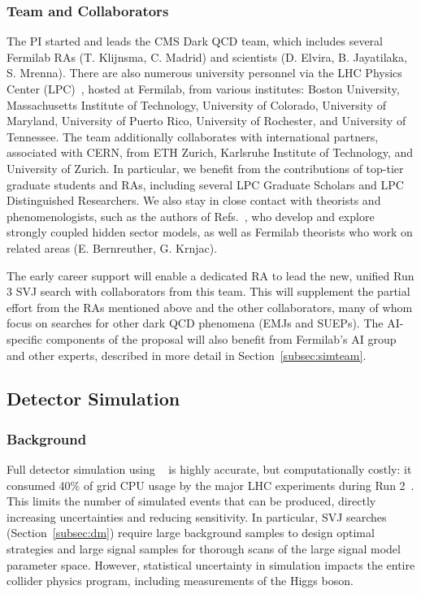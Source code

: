 \subsubsection{Team and Collaborators}\label{subsec:dmteam}

The PI started and leads the CMS Dark QCD team, which includes several Fermilab RAs (T. Klijnsma, C. Madrid) and scientists (D. Elvira, B. Jayatilaka, S. Mrenna).
There are also numerous university personnel via the LHC Physics Center (LPC)~\cite{LPC}, hosted at Fermilab, from various institutes:
Boston University, Massachusetts Institute of Technology, University of Colorado, University of Maryland, University of Puerto Rico, University of Rochester, and University of Tennessee.
The team additionally collaborates with international partners, associated with CERN, from ETH Zurich, Karlsruhe Institute of Technology, and University of Zurich.
In particular, we benefit from the contributions of top-tier graduate students and RAs, including several LPC Graduate Scholars and LPC Distinguished Researchers.
We also stay in close contact with theorists and phenomenologists,
such as the authors of Refs.~\cite{Strassler:2006im,Cohen:2015toa,Schwaller:2015gea,Knapen:2016hky,Albouy:2022cin}, who develop and explore strongly coupled hidden sector models,
as well as Fermilab theorists who work on related areas (E. Bernreuther, G. Krnjac).

The early career support will enable a dedicated RA to lead the new, unified Run 3 SVJ search with collaborators from this team.
This will supplement the partial effort from the RAs mentioned above and the other collaborators, many of whom focus on searches for other dark QCD phenomena (EMJs and SUEPs).
The AI-specific components of the proposal will also benefit from Fermilab's AI group and other experts, described in more detail in Section~\ref{subsec:simteam}.

\subsection{Detector Simulation}\label{subsec:sim}

\subsubsection{Background}\label{subsec:simbkg}

Full detector simulation using \GEANTfour~\cite{Agostinelli:2002hh} is highly accurate, but computationally costly:
it consumed 40\% of grid CPU usage by the major LHC experiments during Run 2~\cite{Apostolakis:2018ieg}.
This limits the number of simulated events that can be produced, directly increasing uncertainties and reducing sensitivity.
In particular, SVJ searches (Section~\ref{subsec:dm}) require large background samples to design optimal strategies
and large signal samples for thorough scans of the large signal model parameter space.
However, statistical uncertainty in simulation impacts the entire collider physics program, including measurements of the Higgs boson.

